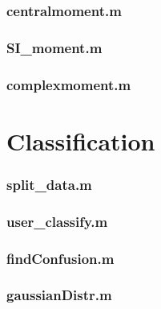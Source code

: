 \subsubsection*{\hypertarget{centralmoment}{centralmoment.m}}


\subsubsection*{\hypertarget{simoment}{SI\_moment.m}}


\subsubsection*{\hypertarget{complex}{complexmoment.m}}


\newpage
\section{Classification}
\subsubsection*{\hypertarget{splitdata}{split\_data.m}}


\subsubsection*{\hypertarget{userclf}{user\_classify.m}}


\subsubsection*{\hypertarget{findconf}{findConfusion.m}}


\subsubsection*{\hypertarget{gaussianDistr}{gaussianDistr.m}}


